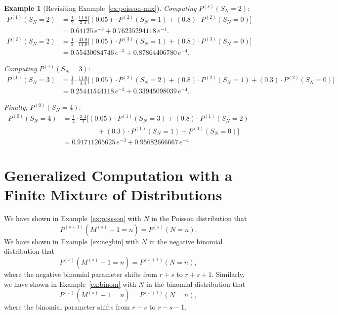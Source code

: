 \documentclass[11pt]{amsart}
\theoremstyle{definition}
\newtheorem{example}{Example}
\theoremstyle{plain}
\begin{document}
\begin{example}[Revisiting Example~\ref{ex:poisson-mix}]
\noindent\textit{Computing} $P^{(s)}(S_N = 2)$:
\begin{align*}
P^{(1)}(S_N = 2)
    &= \frac{1}{2}\cdot\frac{11.8}{3.4}
       \bigl[(0.05)\cdot P^{(2)}(S_N = 1) + (0.8)\cdot P^{(2)}(S_N = 0)\bigr] \\
    &= 0.64125\,e^{-3} + 0.76235294118\,e^{-4}. \\
P^{(2)}(S_N = 2)
    &= \frac{1}{2}\cdot\frac{41.8}{11.8}
       \bigl[(0.05)\cdot P^{(3)}(S_N = 1) + (0.8)\cdot P^{(3)}(S_N = 0)\bigr] \\
    &= 0.55430084746\,e^{-3} + 0.87864406780\,e^{-4}.
\end{align*}

\noindent\textit{Computing} $P^{(1)}(S_N = 3)$:
\begin{align*}
P^{(1)}(S_N = 3)
    &= \frac{1}{3}\cdot\frac{11.8}{3.4}
       \bigl[(0.05)\cdot P^{(2)}(S_N = 2) + (0.8)\cdot P^{(2)}(S_N = 1)
       + (0.3)\cdot P^{(2)}(S_N = 0)\bigr] \\
    &= 0.25441544118\,e^{-3} + 0.33945098039\,e^{-4}.
\end{align*}

\noindent\textit{Finally,} $P^{(0)}(S_N = 4)$:
\begin{align*}
P^{(0)}(S_N = 4)
    &= \frac{1}{4}\cdot\frac{3.4}{1}
       \bigl[(0.05)\cdot P^{(1)}(S_N = 3) + (0.8)\cdot P^{(1)}(S_N = 2) \\
    &\qquad\qquad\quad + (0.3)\cdot P^{(1)}(S_N = 1)
       + P^{(1)}(S_N = 0)\bigr] \\
    &= \boxed{0.91711265625\,e^{-3} + 0.95682666667\,e^{-4}}.
\end{align*}
\end{example}

\section{Generalized Computation with a Finite Mixture of Distributions}

We have shown in Example~\ref{ex:poisson} with $N$ in the Poisson distribution that
\[
    P^{(s+1)}(M^{(s)} - 1 = n) = P^{(s)}(N = n).
\]
We have shown in Example~\ref{ex:negbin} with $N$ in the negative binomial distribution that
\[
    P^{(s)}(M^{(s)} - 1 = n) = P^{(s+1)}(N = n),
\]
where the negative binomial parameter shifts from $r + s$ to $r + s + 1$.  Similarly, we
have shown in Example~\ref{ex:binom} with $N$ in the binomial distribution that
\[
    P^{(s)}(M^{(s)} - 1 = n) = P^{(s+1)}(N = n),
\]
where the binomial parameter shifts from $r - s$ to $r - s - 1$.
\end{document}
